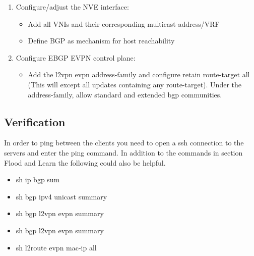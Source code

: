 \documentclass[11pt,titlepage]{article}
\newenvironment{shadedquotation}
 {\begin{shaded*}
  \quoting[leftmargin=0pt, vskip=0pt]
 }
 {\endquoting
 \end{shaded*}
}
\begin{document}
\begin{shadedquotation}
\begin{enumerate}
\begin{itemize}
		\end{itemize}
		\item Configure/adjust the NVE interface:
		\begin{itemize}
			\item Add all VNIs and their corresponding multicast-address/VRF
			\item Define BGP as mechanism for host reachability	
		\end{itemize}
		\item Configure EBGP EVPN control plane:
		\begin{itemize}
			\item Add the l2vpn evpn address-family and configure retain route-target all (This will except all updates containing any route-target). Under the address-family, allow standard and extended bgp communities.
		\end{itemize}
	\end{enumerate}
\end{shadedquotation}
\subsection{Verification}
In order to ping between the clients you need to open a ssh connection to the servers and enter
the ping command. In addition to the commands in section Flood and Learn the following could
also be helpful.
\begin{shadedquotation}
	\begin{itemize}
		\item sh ip bgp sum
		\item sh bgp ipv4 unicast summary
		\item sh bgp l2vpn evpn summary
		\item sh bgp l2vpn evpn summary
		\item sh l2route evpn mac-ip all
	\end{itemize}
\end{shadedquotation}
\end{document}
